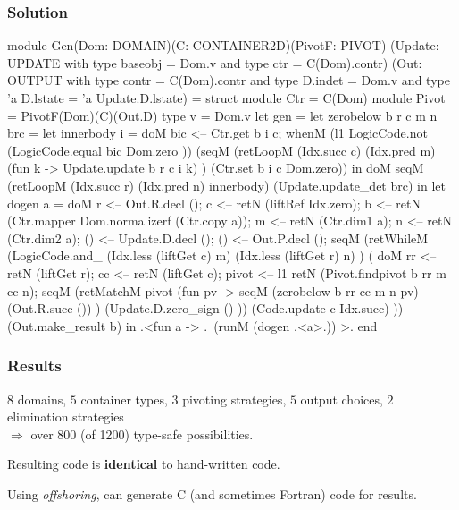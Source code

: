 \documentclass{beamer}
\begin{document}
\begin{frame}[fragile]
    \frametitle{Solution}
\begin{code2}
module Gen(Dom: DOMAIN)(C: CONTAINER2D)(PivotF: PIVOT)
          (Update: UPDATE with type baseobj = Dom.v 
                          and type ctr = C(Dom).contr)
          (Out: OUTPUT with type contr = C(Dom).contr 
                       and type D.indet = Dom.v 
                       and type 'a D.lstate = 'a Update.D.lstate) =
   struct
    module Ctr = C(Dom) module Pivot = PivotF(Dom)(C)(Out.D)
    type v = Dom.v
    let gen =
      let zerobelow b r c m n brc =
        let innerbody i = doM
            bic <-- Ctr.get b i c;
            whenM (l1 LogicCode.not (LogicCode.equal bic Dom.zero ))
                (seqM (retLoopM (Idx.succ c) (Idx.pred m)
                          (fun k -> Update.update b r c i k) )
					  (Ctr.set b i c Dom.zero)) in 
        doM seqM (retLoopM (Idx.succ r) (Idx.pred n) innerbody) 
                   (Update.update_det brc) in
      let dogen a = doM
          r <-- Out.R.decl ();
          c <-- retN (liftRef Idx.zero);
          b <-- retN (Ctr.mapper Dom.normalizerf (Ctr.copy a));
          m <-- retN (Ctr.dim1 a);
          n <-- retN (Ctr.dim2 a);
          () <-- Update.D.decl ();
          () <-- Out.P.decl ();
          seqM 
            (retWhileM (LogicCode.and_ (Idx.less (liftGet c) m)
                                       (Idx.less (liftGet r) n) )
               ( doM
               rr <-- retN (liftGet r);
               cc <-- retN (liftGet c);
               pivot <-- l1 retN (Pivot.findpivot b rr m cc n);
               seqM (retMatchM pivot (fun pv -> 
                        seqM (zerobelow b rr cc m n pv)
                             (Out.R.succ ()) )
                        (Update.D.zero_sign () ))
                    (Code.update c Idx.succ) ))
            (Out.make_result b)
    in .<fun a -> .~(runM (dogen .<a>.)) >.
end
\end{code2}
\end{frame}

\begin{frame}
    \frametitle{Results}
$8$ domains, $5$ container types, $3$ pivoting strategies, 
$5$ output choices, $2$ elimination strategies\\
$\Longrightarrow$ over 800 (of 1200) type-safe possibilities.

Resulting code is \textbf{identical} to hand-written code.

Using \emph{offshoring}, can generate C (and sometimes Fortran) code
for results.
\end{frame}
\end{document}
